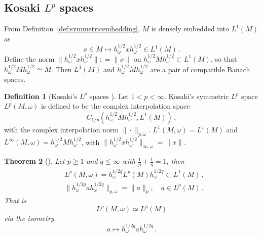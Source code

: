 \documentclass[11pt,a4paper]{article}
\theoremstyle{plain}
\newtheorem{theorem}{Theorem}
\numberwithin{theorem}{section}
\theoremstyle{definition}
\newtheorem{definition}[theorem]{Definition}
\newcommand{\?}{\overset{?}{=}}
\newcommand{\defeq}{\mathrel{\mathop:}=}
\newcommand{\I}{\infty}
\begin{document}
\subsection*{Kosaki \texorpdfstring{$L^p$}{Lp} spaces}
From Definition~\ref{def:symmetricembedding}, $M$ is densely embedded into $L^1(M)$ as
\begin{equation}
    x\in M \mapsto h_\omega^{1/2} xh^{1/2}_\omega \in L^1(M)\,.
\end{equation}
Define the norm $\|h_\omega^{1/2} xh^{1/2}_\omega\|\defeq\|x\| $ on $h_\omega^{1/2} Mh^{1/2}_\omega\subset L^1(M)$, so that $h_\omega^{1/2} Mh^{1/2}_\omega \simeq M$. Then $L^1(M)$ and $h_\omega^{1/2} Mh^{1/2}_\omega$ are a pair of compatible Banach spaces.
\begin{definition}[Kosaki's $L^p$ spaces \cite{KOSAKI198429}]
    Let $1<p<\I$. Kosaki's symmetric $L^p$ space $L^p(M,\omega)$ is defined to be the complex interpolation space
    \begin{equation}
        C_{1/p}(h_\omega^{1/2} M h_\omega^{1/2},L^1(M))\,,
    \end{equation}
    with the complex interpolation norm $\|\cdot\|_{p,\omega}$. $L^1(M,\omega)=L^1(M)$ and $L^\I(M,\omega)=h_\omega^{1/2} M h_\omega^{1/2}$, with $\|h_\omega^{1/2} x h_\omega^{1/2}\|_{\I,\omega}=\|x\|$.
\end{definition}

\begin{theorem}[\cite{KOSAKI198429}]\label{thm:haagerup-kosaki}
    Let $p\geq 1$ and $q \leq\I$ with $\frac1p+\frac1q=1$, then
    \begin{align}
        &L^p(M,\omega)=h_\omega^{1/2q} L^p(M) h_\omega^{1/2q} \subset L^1(M)\,,\\
        &\|h_\omega^{1/2q} a h_\omega^{1/2q}\|_{p,\omega} = \|a\|_p, \quad a\in L^p(M)\,.
    \end{align}
    That is
    \begin{equation}
        L^p(M,\omega) \simeq L^p(M)
    \end{equation}
    via the isometry
    \begin{equation}
        a\mapsto h_\omega^{1/2q} a h_\omega^{1/2q}\,.
    \end{equation}
\end{theorem}
\end{document}
